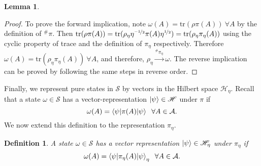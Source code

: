 \documentclass[amsmath,amssymb,aps,pra,superscriptaddress,twocolumn]{revtex4-2}
\newtheorem{definition}{Definition}
\newtheorem{lemma}[theorem]{Lemma}
\begin{document}
\begin{appendix}
\begin{lemma}
\end{lemma}
\begin{proof}
To prove the forward implication, note $\omega(A) = \text{tr}(\rho \pi(A)) \ \forall A$ by the definition of ${}^\#\pi$. Then
$\text{tr}(\rho \pi(A)) = \text{tr}(\rho_\eta \eta^{\nicefrac{-1}{2}}\pi(A) \eta^{\nicefrac{1}{2}})
=\text{tr}(\rho_\eta\pi_\eta(A))$ using the cyclic property of trace and the definition of $\pi_\eta$ respectively.
Therefore $\omega(A) = \text{tr}(\rho_\eta\pi_\eta(A)) \ \forall A$, and therefore, $\rho_\eta\stackrel{\!\!{}^{\#}\!\pi_\eta}{\to} \omega$.
The reverse implication can be proved by following the same steps in reverse order.

\end{proof}

Finally, we represent pure states in $\mathcal{S}$ by vectors in the Hilbert space $\mathscr{H}_\eta$.
Recall that a state $\omega \in \mathcal{S}$ has a vector-representation $\ket{\psi} \in \mathscr{H}$ under $\pi$ if 
\begin{equation}
    \omega(A) = \braket{\psi | \pi(A)|\psi} \;\; 
    \forall A \in \mathcal{A}.
\end{equation}
We now extend this definition to the representation $\pi_\eta$.
\begin{definition}
\label{def:vecrep}
A state $\omega \in \mathcal{S}$ has a vector representation $\ket{\psi} \in \mathscr{H}_\eta$ under $\pi_\eta$ if 
\begin{equation}
    \omega(A) = \braket{\psi | \pi_\eta(A)|\psi}_\eta \;\; \forall A \in \mathcal{A}.
\end{equation}
\end{definition}


\end{appendix}
\end{document}
